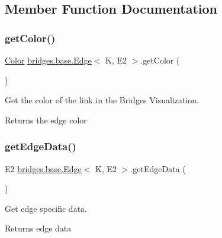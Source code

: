 \subsection{Member Function Documentation}
\mbox{\label{classbridges_1_1base_1_1_edge_a243d9e6a57ebb570dda81bffe0cd4b77}} 
\subsubsection{\texorpdfstring{get\+Color()}{getColor()}}
{\footnotesize\ttfamily \hyperlink{classbridges_1_1base_1_1_color}{Color} \hyperlink{classbridges_1_1base_1_1_edge}{bridges.\+base.\+Edge}$<$ K, E2 $>$.get\+Color (\begin{DoxyParamCaption}{ }\end{DoxyParamCaption})}



Get the color of the link in the Bridges Visualization. 

\begin{DoxyReturn}{Returns}
the edge color 
\end{DoxyReturn}
\mbox{\label{classbridges_1_1base_1_1_edge_a19a623d647eb17b7e53f1360577b0703}} 
\subsubsection{\texorpdfstring{get\+Edge\+Data()}{getEdgeData()}}
{\footnotesize\ttfamily E2 \hyperlink{classbridges_1_1base_1_1_edge}{bridges.\+base.\+Edge}$<$ K, E2 $>$.get\+Edge\+Data (\begin{DoxyParamCaption}{ }\end{DoxyParamCaption})}

Get edge specific data.

\begin{DoxyReturn}{Returns}
edge data 
\end{DoxyReturn}
\mbox{\label{classbridges_1_1base_1_1_edge_afc23a7c2ee8ab4c4f0950c9bf25edd56}} 
